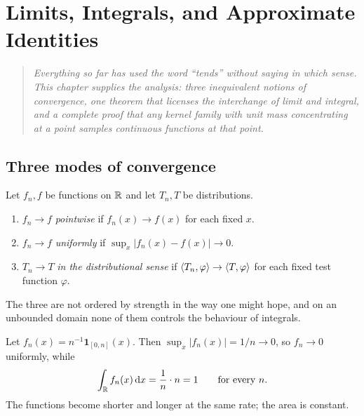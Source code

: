 \chapter{Limits, Integrals, and Approximate Identities}
\label{ch:limits}

\begin{quote}
\itshape
Everything so far has used the word ``tends'' without saying in which sense. This chapter supplies
the analysis: three inequivalent notions of convergence, one theorem that licenses the interchange
of limit and integral, and a complete proof that any kernel family with unit mass concentrating at a
point samples continuous functions at that point.
\end{quote}

\section{Three modes of convergence}

Let $f_{n},f$ be functions on $\mathbb{R}$ and let $T_{n},T$ be distributions.

\begin{definition}\label{def:modes}
\begin{enumerate}
\item $f_{n}\to f$ \emph{pointwise} if $f_{n}(x)\to f(x)$ for each fixed $x$.
\item $f_{n}\to f$ \emph{uniformly} if $\sup_{x}|f_{n}(x)-f(x)|\to0$.
\item $T_{n}\to T$ \emph{in the distributional sense} if $\langle T_{n},\varphi\rangle\to\langle T,\varphi\rangle$ for
each fixed test function $\varphi$.
\end{enumerate}
\end{definition}

The three are not ordered by strength in the way one might hope, and on an unbounded domain none of
them controls the behaviour of integrals.

\begin{example}\label{ex:uniform}
Let $f_{n}(x)=n^{-1}\mathbf{1}_{[0,n]}(x)$. Then $\sup_{x}|f_{n}(x)|=1/n\to0$, so $f_{n}\to0$
uniformly, while
\begin{equation}
\int_{\mathbb{R}}f_{n}(x)\,\mathrm{d} x=\frac{1}{n}\cdot n=1
\qquad\text{for every }n .
\end{equation}
The functions become shorter and longer at the same rate; the area is constant.
\end{example}

